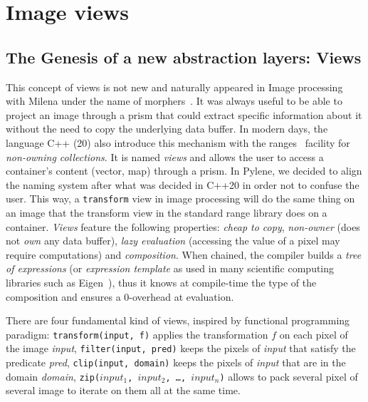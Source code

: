 \chapter{Image views}
\label{chap.image_views}

\section{The Genesis of a new abstraction layers: Views}

This concept of views is not new and naturally appeared in Image processing with Milena under the name of
morphers~\parencite{levillain.2009.ismm, geraud.2012.hdr}. It was always useful to be able to project an image through a
prism that could extract specific information about it without the need to copy the underlying data buffer. In modern
days, the language C++ (20) also introduce this mechanism with the ranges~\parencite{niebler.2014.ranges} facility for
\emph{non-owning collections}. It is named \emph{views} and allows the user to access a container's content (vector,
map) through a prism. In Pylene, we decided to align the naming system after what was decided in C++20 in order not to
confuse the user. This way, a \texttt{transform} view in image processing will do the same thing on an image that the
transform view in the standard range library does on a container. \emph{Views} feature the following properties:
\emph{cheap to copy}, \emph{non-owner} (does not \emph{own} any data buffer), \emph{lazy evaluation} (accessing the
value of a pixel may require computations) and \emph{composition}. When chained, the compiler builds a \emph{tree of
  expressions} (or \emph{expression template} as used in many scientific computing libraries such as
Eigen~\cite{guennebaud.2010.eigen}), thus it knows at compile-time the type of the composition and ensures a 0-overhead
at evaluation.

There are four fundamental kind of views, inspired by functional programming paradigm: \texttt{transform(input, f)}
applies the transformation $f$ on each pixel of the image \emph{input}, \texttt{filter(input, pred)} keeps the pixels of
\emph{input} that satisfy the predicate \emph{pred}, \texttt{clip(input, domain)} keeps the pixels of \emph{input}
that are in the domain \emph{domain}, \texttt{zip($input_1$, $input_2$, \ldots, $input_n$)} allows to pack several pixel
of several image to iterate on them all at the same time.


